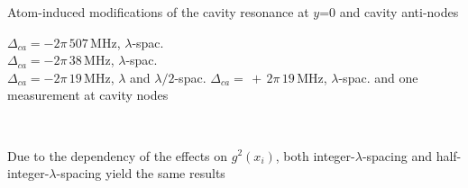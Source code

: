 \documentclass{beamer}
\begin{document}
\begin{frame}{Atom-induced modifications of the cavity resonance {\tiny at $y$=0 and cavity anti-nodes}}
	\begin{minipage}{0.43\textwidth}
		\footnotesize
		\textcolor[rgb]{0.729, 0.302, 0.235}{$\Delta_{ca}=-2\pi\,507\,$MHz, $\lambda$-spac.}\\
		\textcolor[rgb]{0.361, 0.643, 0.294}{$\Delta_{ca}=-2\pi\,38\,$MHz, $\lambda$-spac.}\\
		\textcolor[rgb]{0.553, 0.231, 0.376}{$\Delta_{ca}=-2\pi\,19\,$MHz, $\lambda$ and $\lambda/2$-spac.}
		\textcolor[rgb]{0.263, 0.443, 0.953}{$\Delta_{ca}=\,+\,2\pi\,19\,$MHz, $\lambda$-spac. and one\\ \makebox[26pt]{}measurement at cavity nodes}
	\end{minipage}\\
	\begin{minipage}{0.59\textwidth}
		Due to the dependency of the effects on $g^2(x_i)$, both integer-$\lambda$-spacing and half-integer-$\lambda$-spacing yield the same results
	\end{minipage}
\end{frame}
\end{document}
